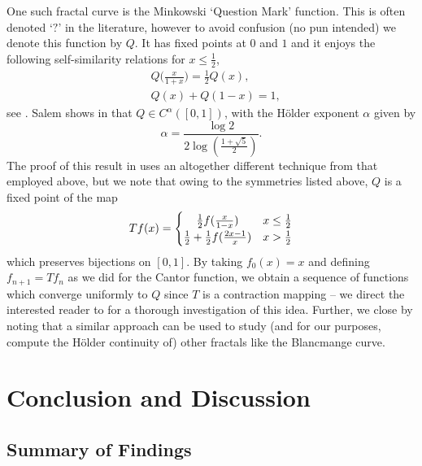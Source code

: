 \documentclass[oneside,hidelinks,indentfirst,10pt]{book}
\begin{document}
One such fractal curve is the Minkowski `Question Mark' function. This is often denoted `\(?\)' in the literature, however to avoid confusion (no pun intended) we denote this function by \(Q\). It has fixed points at \(0\) and \(1\) and it enjoys the following self-similarity relations for \(x\leq \frac{1}{2}\),
\begin{align*}
    &Q\bigg(\frac{x}{1+x}\bigg)=\frac{1}{2}Q(x),\\
    &Q(x)+Q(1-x)=1,
\end{align*}
see \cite{ALKAUSKAS_2009}. Salem shows in \cite{salem} that \(Q\in C^{\alpha}([0,1])\), with the H\"older exponent \(\alpha\) given by
\[
    \alpha=\frac{\log 2}{2\log(\frac{1+\sqrt{5}}{2})}.
\]
The proof of this result in \cite{salem} uses an altogether different technique from that employed above, but we note that owing to the symmetries listed above, \(Q\) is a fixed point of the map
\[
    Tf(x)=\begin{cases}
    \hfil\frac{1}{2}f(\frac{x}{1-x}) & x\leq\frac{1}{2}\\
    \frac{1}{2}+\frac{1}{2}f(\frac{2x-1}{x}) & x>\frac{1}{2}
    \end{cases}
\]
which preserves bijections on \([0,1]\). By taking \(f_0(x)=x\) and defining \(f_{n+1}=Tf_n\) as we did for the Cantor function, we obtain a sequence of functions which converge uniformly to \(Q\) since \(T\) is a contraction mapping -- we direct the interested reader to \cite{bezier} for a thorough investigation of this idea. Further, we close by noting that a similar approach can be used to study (and for our purposes, compute the H\"older continuity of) other fractals like the Blancmange curve.%
\chapter{Conclusion and
Discussion }\label{chap:last}


\section{Summary of Findings}
\end{document}
